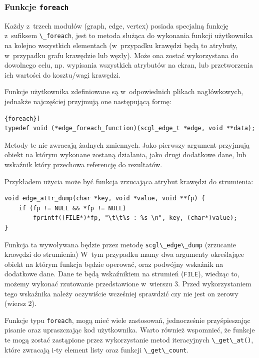 \documentclass[a4paper,12pt,polish,twoside,openright]{thesis}
\newcommand\code[1]{\lstinline[style=line]{#1}}
\begin{document}
\subsubsection*{Funkcje \code{foreach}}
\label{sec:foreach}
Każdy z~trzech modułów (graph, edge, vertex) posiada specjalną funkcję z~sufiksem \code{\_foreach}, jest to metoda służąca do wykonania funkcji użytkownika na kolejno wszystkich elementach (w~przypadku krawędzi będą to atrybuty, w~przypadku grafu krawędzie lub węzły).
Może ona zostać wykorzystana do dowolnego celu, np. wypisania wszystkich atrybutów na ekran, lub przetworzenia ich wartości do kosztu/wagi krawędzi.

Funkcje użytkownika zdefiniowane są w~odpowiednich plikach nagłówkowych, jednakże najczęściej przyjmują one następującą formę:
\begin{lstlisting}[style=coden,caption=Przykładowa definicja funkcji użytkownika na potrzeby funkcji \code{foreach}]
typedef void (*edge_foreach_function)(scgl_edge_t *edge, void **data);
\end{lstlisting}
Metody te nie zwracają żadnych zmiennych.
Jako pierwszy argument przyjmują obiekt na którym wykonane zostaną działania, jako drugi dodatkowe dane, lub wskaźnik który przechowa referencję do rezultatów.

Przykładem użycia może być funkcja zrzucająca atrybut krawędzi do strumienia:
\begin{lstlisting}[style=code,caption=Przykładowa funkcja wykorzystywana przez metodę scgl\_edge\_dump]
void edge_attr_dump(char *key, void *value, void **fp) {
	if (fp != NULL && *fp != NULL)
		fprintf((FILE*)*fp, "\t\t%s : %s \n", key, (char*)value);
}
\end{lstlisting}
Funkcja ta wywoływana będzie przez metodę \code{scgl\_edge\_dump} (zrzucanie krawędzi do strumienia)
W~tym przypadku mamy dwa argumenty określające obiekt na którym funkcja będzie operować, oraz podwójny wskaźnik na dodatkowe dane.
Dane te będą wskaźnikiem na strumień (\code{FILE}), wiedząc to, możemy wykonać rzutowanie przedstawione w~wierszu 3.
Przed wykorzystaniem tego wskaźnika należy oczywiście wcześniej sprawdzić czy nie jest on zerowy (wiersz 2).

Funkcje typu \code{foreach}, mogą mieć wiele zastosowań, jednocześnie przyśpieszając pisanie oraz upraszczając kod użytkownika.
Warto również wspomnieć, że funkcje te mogą zostać zastąpione przez wykorzystanie metod iteracyjnych \code{\_get\_at()}, które zwracają i-ty element listy oraz funkcji \code{\_get\_count}.
\end{document}
